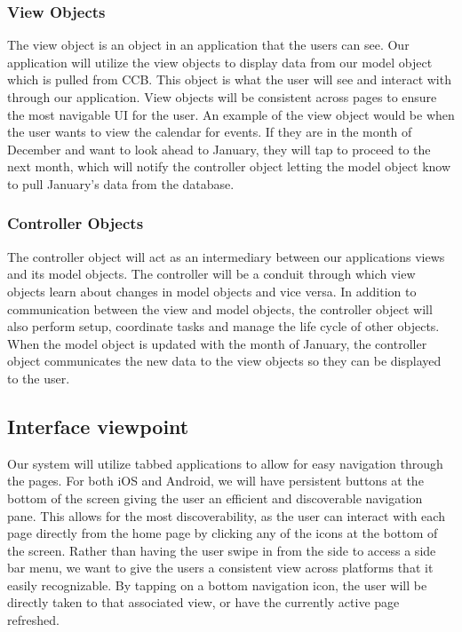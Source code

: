 \documentclass[letterpaper,10pt,draftclsnofoot,onecolumn,titlepage]{IEEEtran}
\begin{document}
			\subsubsection{View Objects}
				The view object is an object in an application that the users can see.
				Our application will utilize the view objects to display data from our model object which is pulled from CCB.
				This object is what the user will see and interact with through our application.
				View objects will be consistent across pages to ensure the most navigable UI for the user.
				An example of the view object would be when the user wants to view the calendar for events.
				If they are in the month of December and want to look ahead to January, they will tap to proceed to the next month, which will notify the controller object letting the model object know to pull January's data from the database.

			\subsubsection{Controller Objects}
				The controller object will act as an intermediary between our applications views and its model objects.
				The controller will be a conduit through which view objects learn about changes in model objects and vice versa.
				In addition to communication between the view and model objects, the controller object will also perform setup, coordinate tasks and manage the life cycle of other objects.
				When the model object is updated with the month of January, the controller object communicates the new data to the view objects so they can be displayed to the user.


		\subsection{Interface viewpoint}
			Our system will utilize tabbed applications to allow for easy navigation through the pages.
			For both iOS and Android, we will have persistent buttons at the bottom of the screen giving the user an efficient and discoverable navigation pane.
			This allows for the most discoverability, as the user can interact with each page directly from the home page by clicking any of the icons at the bottom of the screen.
			Rather than having the user swipe in from the side to access a side bar menu, we want to give the users a consistent view across platforms that it easily recognizable.
			By tapping on a bottom navigation icon, the user will be directly taken to that associated view, or have the currently active page refreshed.
\end{document}
